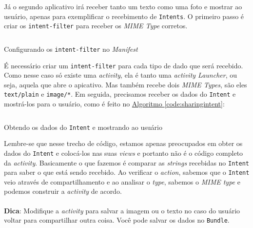 \documentclass[a4paper,12pt,brazil,oneside]{book}
\begin{document}
\begin{singlespace}
		Já o segundo aplicativo irá receber tanto um texto como uma foto e mostrar ao usuário, apenas para exemplificar o recebimento de \texttt{Intents}. O primeiro passo é criar os \texttt{intent-filter} para receber os \emph{MIME Type} corretos.

		\begin{listing}[H]
		\inputminted[linenos=true,fontsize=\small,frame=lines, framesep=2mm, tabsize=2,numbersep=5pt]{xml}{src/api/sharing/intentfilter.xml}
		\caption{Configurando os \texttt{intent-filter} no \emph{Manifest}}
		\label{code:intentfilter}
		\end{listing} 	

		É necessário criar um \texttt{intent-filter} para cada tipo de dado que será recebido. Como nesse caso só existe uma \emph{activity}, ela é tanto uma \emph{activity Launcher}, ou seja, aquela que abre o apicativo. Mas também recebe dois \emph{MIME Types}, são eles \texttt{text/plain} e \texttt{image/*}. Em seguida, precisamos receber os dados do \texttt{Intent} e mostrá-los para o usuário, como é feito no \hyperref[code:sharingintent]{Algoritmo \ref*{code:sharingintent}}:

		\begin{listing}[H]
		\inputminted[linenos=true,fontsize=\small,frame=lines, framesep=2mm, tabsize=2,numbersep=5pt]{java}{src/api/sharing/receive.java}
		\caption{Obtendo os dados do \texttt{Intent} e mostrando ao usuário}
		\label{code:sharingintent}
		\end{listing} 		

		Lembre-se que nesse trecho de código, estamos apenas preocupados em obter os dados do \texttt{Intent} e colocá-los nas suas \emph{views} e portanto não é o código completo da \emph{activity}. Basicamente o que fazemos é comparar as \emph{strings} recebidas no \texttt{Intent} para saber o que está sendo recebido. Ao verificar o \emph{action}, sabemos que o \texttt{Intent} veio através de compartilhamento e ao analisar o \emph{type}, sabemos o \emph{MIME type} e podemos construir a \emph{activity} de acordo.

\begin{framed}
\paragraph{}\textbf{Dica}: Modifique a \emph{activity} para salvar a imagem ou o texto no caso do usuário voltar para compartilhar outra coisa. Você pode salvar os dados no \texttt{Bundle}.
\textit{}
\end{framed}


\end{singlespace}
\end{document}

